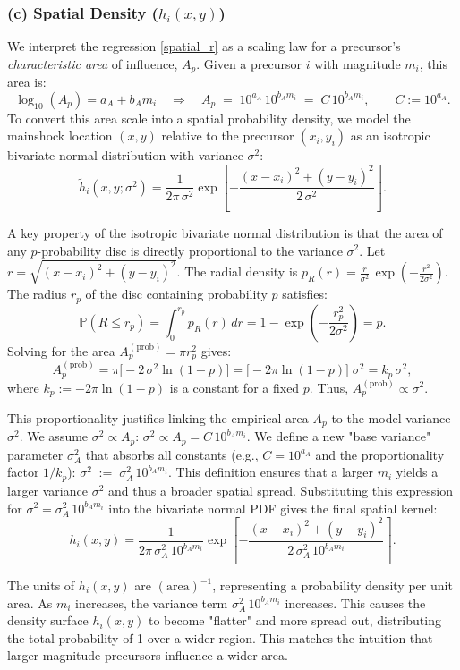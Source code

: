 \documentclass[linenum,doublespace,onecolumn]{SSA-SRL}
\theoremstyle{lemma}
\begin{document}
\subsubsection{(c) Spatial Density (\texorpdfstring{$h_i(x,y)$}{hi(x,y)})}

We interpret the regression \eqref{spatial_r} as a scaling law for a precursor’s \emph{characteristic area} of influence, \(A_p\). Given a precursor \(i\) with magnitude \(m_i\), this area is:
\[
\log_{10}(A_p)=a_A+b_A m_i
\quad\Longrightarrow\quad
A_p \;=\; 10^{a_A}\,10^{b_A m_i} \;=\; C\,10^{b_A m_i},\qquad C:=10^{a_A}.
\]
To convert this area scale into a spatial probability density, we model the mainshock location $(x,y)$ relative to the precursor \((x_i,y_i)\) as an isotropic bivariate normal distribution with variance \(\sigma^2\):
\[
\tilde h_i(x,y;\sigma^2)
=
\frac{1}{2\pi\,\sigma^2}
\exp\!\left[-\frac{(x-x_i)^2+(y-y_i)^2}{2\,\sigma^2}\right].
\]

A key property of the isotropic bivariate normal distribution is that the area of any \(p\)-probability disc is directly proportional to the variance \(\sigma^2\).
Let $r=\sqrt{(x-x_i)^2+(y-y_i)^2}$. The radial density is $p_R(r)=\frac{r}{\sigma^2}\,\exp(-\frac{r^2}{2\sigma^2})$.
The radius \(r_p\) of the disc containing probability \(p\) satisfies:
\[
\mathbb{P}(R\le r_p) = \int_0^{r_p} p_R(r)\,dr = 1-\exp\!\left(-\frac{r_p^2}{2\sigma^2}\right)=p.
\]
Solving for the area $A_p^{(\text{prob})}=\pi r_p^2$ gives:
\[
A_p^{(\text{prob})}
= \pi \bigl[-2\,\sigma^2\ln(1-p)\bigr]
= \bigl[-2\pi\ln(1-p)\bigr]\;\sigma^2
= k_p\,\sigma^2,
\]
where $k_p:=-2\pi\ln(1-p)$ is a constant for a fixed \(p\). Thus, $A_p^{(\text{prob})} \propto \sigma^2$.

This proportionality justifies linking the empirical area $A_p$ to the model variance $\sigma^2$. We assume $\sigma^2 \propto A_p$: $\sigma^2 \propto A_p = C\,10^{b_A m_i}.$
We define a new "base variance" parameter $\sigma_A^2$ that absorbs all constants (e.g., $C=10^{a_A}$ and the proportionality factor $1/k_p$):
$ \sigma^2 \;:=\; \sigma_A^2\,10^{b_A m_i}.$
This definition ensures that a larger \(m_i\) yields a larger variance \(\sigma^2\) and thus a broader spatial spread. Substituting this expression for $\sigma^2 = \sigma_A^2\,10^{b_A m_i}$ into the bivariate normal PDF gives the final spatial kernel:
\[
h_i(x,y)
=
\frac{1}{2\pi\,\sigma_A^2\,10^{b_A m_i}}
\exp\!\left[-\frac{(x-x_i)^2+(y-y_i)^2}{2\,\sigma_A^2\,10^{b_A m_i}}\right].
\]

The units of $h_i(x,y)$ are $(\text{area})^{-1}$, representing a probability density per unit area. As $m_i$ increases, the variance term $\sigma_A^2\,10^{b_A m_i}$ increases. This causes the density surface $h_i(x,y)$ to become "flatter" and more spread out, distributing the total probability of 1 over a wider region. This matches the intuition that larger-magnitude precursors influence a wider area.
\end{document}
